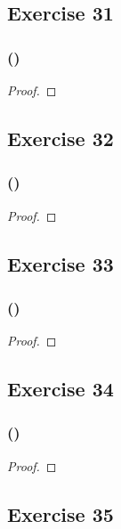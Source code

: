 \documentclass[14pt]{extarticle}
\begin{document}
\subsection{Exercise 31}

\subsubsection{()}

\begin{proof}

\end{proof}

\subsection{Exercise 32}

\subsubsection{()}

\begin{proof}

\end{proof}

\subsection{Exercise 33}

\subsubsection{()}

\begin{proof}

\end{proof}

\subsection{Exercise 34}

\subsubsection{()}

\begin{proof}

\end{proof}

\subsection{Exercise 35}
\end{document}
